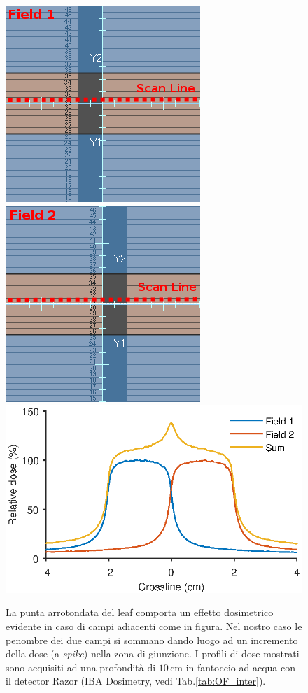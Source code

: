 \begin{figure}[!t]
\centering
\includegraphics[width=.35\textwidth]{./cap2/tip5.png}
\includegraphics[width=.35\textwidth]{./cap2/tip6.png}\\\vspace{.3cm}
\includegraphics[width=.7\textwidth]{./cap2/MLC_Plots/Abutted/abutted_m.eps}
\caption{La punta arrotondata del leaf comporta un effetto dosimetrico evidente in caso di campi adiacenti come in figura. Nel nostro caso le penombre dei due campi si sommano dando luogo ad un incremento della dose (a \textit{spike}) nella zona di giunzione. I profili di dose mostrati sono acquisiti ad una profondità di $10\,$cm in fantoccio ad acqua con il detector Razor (IBA Dosimetry, vedi Tab.\ref{tab:OF_inter}).}
\label{fig:MLC_tip_effect}
\end{figure}
